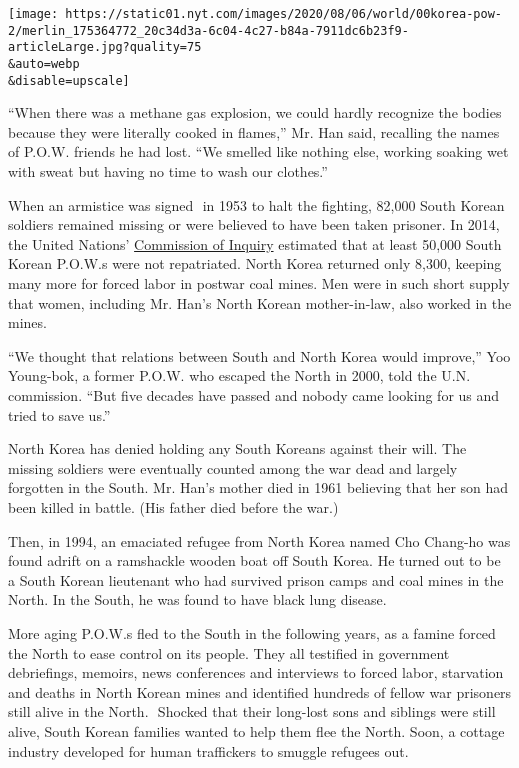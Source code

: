 \texttt{[image: https://static01.nyt.com/images/2020/08/06/world/00korea-pow-2/merlin\_175364772\_20c34d3a-6c04-4c27-b84a-7911dc6b23f9-articleLarge.jpg?quality=75\\\&auto=webp\\\&disable=upscale]}

``When there was a methane gas explosion, we could hardly recognize the
bodies because they were literally cooked in flames,'' Mr. Han said,
recalling the names of P.O.W. friends he had lost. ``​We smelled like
nothing else, working soaking wet with sweat but ​having no time to wash
our clothes.''

When ​an armistice was signed ​ in 1953​ to halt the fighting, 82,000
South Korean soldiers remained missing or were believed to have been
taken prisoner. In 2014, the United Nations'
\href{https://www.ohchr.org/EN/HRBodies/HRC/CoIDPRK/Pages/CommissionInquiryonHRinDPRK.aspx}{Commission
of Inquiry} estimated that at least 50,000 South Korean P.O.W.s were not
repatriated. North Korea returned only 8,300​​, keeping many more for
forced labor in postwar coal mines. Men were in such short supply that
women, including Mr. Han's North Korean mother-in-law, also worked in
the mines.

``We thought that relations between South and North Korea would
improve,'' Yoo Young-bok, a former P.O.W. who escaped the North in 2000,
told the U.N. commission. ``But five decades have passed and nobody came
looking for us and tried to save us.''

North Korea ​has denied holding ​any South Koreans against their will.
The missing soldiers were ​eventually ​counted among the war dead and
largely forgotten in the South. Mr. Han's mother died in 1961 believing
that her son ​had been killed in battle. (His father died before the
war.)

Then, in 1994, an emaciated refugee from North Korea named Cho Chang-ho
was found adrift on a ramshackle wooden boat off South Korea. He turned
out to be a South Korean lieutenant who had survived prison camps and
coal mines in the North. In the South, he was found to have black lung
disease.

​More aging P.O.W.s fled to the South in the following years, as a
famine forced the North to ease control on its people. They all
testified in government debriefings, memoirs, news conferences and
interviews to forced labor, starvation and deaths in North Korean mines
and ​identified hundreds of fellow war prisoners still alive in the
North. ​ Shocked that their long-lost sons and siblings were ​still
​alive, South Korean families wanted to help them flee the North​. Soon,
a cottage industry developed for human traffickers to smuggle refugees
out.

